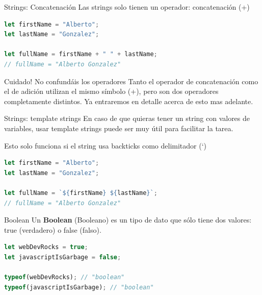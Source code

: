 \documentclass{beamer}
\begin{document}
\begin{frame}[fragile]{Strings: Concatenación}
Las strings solo tienen un operador: concatenación (+)
\begin{lstlisting}[language=JavaScript]
let firstName = "Alberto";
let lastName = "Gonzalez";

let fullName = firstName + " " + lastName;
// fullName = "Alberto Gonzalez"
\end{lstlisting}
\begin{block}{Cuidado! No confundáis los operadores}
Tanto el operador de concatenación como el de adición utilizan el mismo símbolo (+), pero son dos operadores completamente distintos. Ya entraremos en detalle acerca de esto mas adelante.
\end{block}
\end{frame}

\begin{frame}[fragile]{Strings: template strings}
En caso de que quieras tener un string con valores de variables, usar template strings puede ser muy útil para facilitar la tarea.

Esto solo funciona si el string usa backticks como delimitador (`)\bigskip

\begin{lstlisting}[language=JavaScript]
let firstName = "Alberto";
let lastName = "Gonzalez";

let fullName = `${firstName} ${lastName}`;
// fullName = "Alberto Gonzalez"
\end{lstlisting}
\end{frame}

\begin{frame}[fragile]{Boolean}
Un \textbf{Boolean} (Booleano) es un tipo de dato que sólo tiene dos valores: true (verdadero) o false (falso).

\begin{lstlisting}[language=JavaScript]
let webDevRocks = true;
let javascriptIsGarbage = false;

typeof(webDevRocks); // "boolean"
typeof(javascriptIsGarbage); // "boolean"

\end{lstlisting}
\end{frame}
\end{document}

